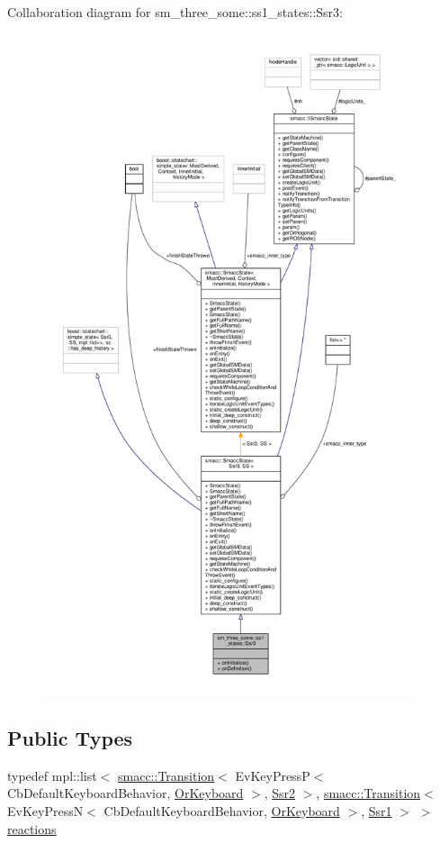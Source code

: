 Collaboration diagram for sm\+\_\+three\+\_\+some\+:\+:ss1\+\_\+states\+:\+:Ssr3\+:\nopagebreak
\begin{figure}[H]
\begin{center}
\leavevmode
\includegraphics[height=550pt]{structsm__three__some_1_1ss1__states_1_1Ssr3__coll__graph}
\end{center}
\end{figure}
\subsection*{Public Types}
\begin{DoxyCompactItemize}
\item 
typedef mpl\+::list$<$ \hyperlink{classsmacc_1_1Transition}{smacc\+::\+Transition}$<$ Ev\+Key\+PressP$<$ Cb\+Default\+Keyboard\+Behavior, \hyperlink{classsm__three__some_1_1OrKeyboard}{Or\+Keyboard} $>$, \hyperlink{structsm__three__some_1_1ss1__states_1_1Ssr2}{Ssr2} $>$, \hyperlink{classsmacc_1_1Transition}{smacc\+::\+Transition}$<$ Ev\+Key\+PressN$<$ Cb\+Default\+Keyboard\+Behavior, \hyperlink{classsm__three__some_1_1OrKeyboard}{Or\+Keyboard} $>$, \hyperlink{structsm__three__some_1_1ss1__states_1_1Ssr1}{Ssr1} $>$ $>$ \hyperlink{structsm__three__some_1_1ss1__states_1_1Ssr3_a6189593dbf24f22a5a1b70aef804660e}{reactions}
\end{DoxyCompactItemize}
